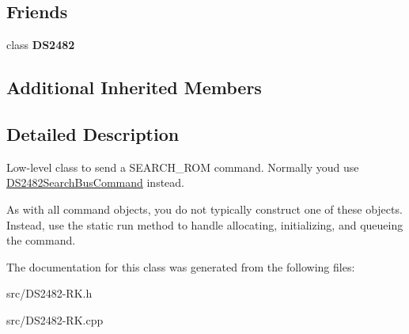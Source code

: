 \subsection*{Friends}
\begin{DoxyCompactItemize}
\item 
\mbox{\label{class_d_s2482_search_rom_afeaf69274324e8dbeebede05c02d9c18}} 
class {\bfseries D\+S2482}
\end{DoxyCompactItemize}
\subsection*{Additional Inherited Members}


\subsection{Detailed Description}
Low-\/level class to send a S\+E\+A\+R\+C\+H\+\_\+\+R\+OM command. Normally you\textquotesingle{}d use \mbox{\hyperlink{class_d_s2482_search_bus_command}{D\+S2482\+Search\+Bus\+Command}} instead. 

As with all command objects, you do not typically construct one of these objects. Instead, use the static run method to handle allocating, initializing, and queueing the command. 

The documentation for this class was generated from the following files\+:\begin{DoxyCompactItemize}
\item 
src/D\+S2482-\/\+R\+K.\+h\item 
src/D\+S2482-\/\+R\+K.\+cpp\end{DoxyCompactItemize}
